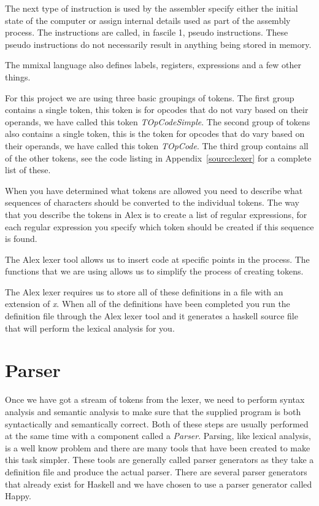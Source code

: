 \documentclass[a4paper,11pt]{report}
\begin{document}
The next type of instruction is used by the assembler specify either the initial state of the computer or assign internal details used as part of the assembly process. The instructions are called, in fascile 1\cite{knuth:aocp2}, pseudo instructions. These pseudo instructions do not necessarily result in anything being stored in memory.

The mmixal language also defines labels, registers, expressions and a few other things.

For this project we are using three basic groupings of tokens. The first group contains a single token, this token is for opcodes that do not vary based on their operands, we have called this token \textit{TOpCodeSimple}. The second group of tokens also contains a single token, this is the token for opcodes that do vary based on their operands, we have called this token \textit{TOpCode}. The third group contains all of the other tokens, see the code listing in Appendix~\ref{source:lexer} for a complete list of these.

When you have determined what tokens are allowed you need to describe what sequences of characters should be converted to the individual tokens. The way that you describe the tokens in Alex is to create a list of regular expressions, for each regular expression you specify which token should be created if this sequence is found.

The Alex lexer tool allows us to insert code at specific points in the process. The functions that we are using allows us to simplify the process of creating tokens.

The Alex lexer requires us to store all of these definitions in a file with an extension of \textit{x}. When all of the definitions have been completed you run the definition file through the Alex lexer tool and it generates a haskell source file that will perform the lexical analysis for you.
\section{Parser}
Once we have got a stream of tokens from the lexer, we need to perform syntax analysis and semantic analysis to make sure that the supplied program is both syntactically and semantically correct. Both of these steps are usually performed at the same time with a component called a \textit{Parser}. Parsing, like lexical analysis, is a well know problem and there are many tools that have been created to make this task simpler. These tools are generally called parser generators as they take a definition file and produce the actual parser. There are several parser generators that already exist for Haskell and we have chosen to use a parser generator called Happy\cite{happy}.
\end{document}
